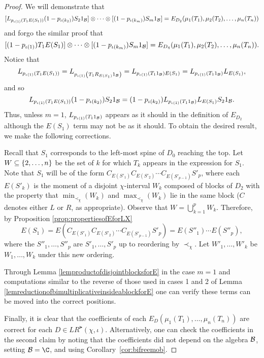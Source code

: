 \begin{proof}
			We will demonstrate that
			\[
				[L_{p_{\iota(1)}\left(T_1E(S_1)\right)}(1-p_{\iota(k_{2})}) S_2 1_{\mathcal{B}}] \otimes \cdots \otimes [(1-p_{\iota(k_{m})}) S_m1_{\mathcal{B}}] = E_{D_2}(\mu_1(T_1), \mu_2(T_2),\ldots, \mu_n(T_n))
			\]
			and forgo the similar proof that
			\[
				[(1-p_{\iota(1)})T_1E(S_1)] \otimes \cdots \otimes [(1-p_{\iota(k_{m})}) S_m1_{\mathcal{B}}] = E_{D_4}(\mu_1(T_1), \mu_2(T_2),\ldots, \mu_n(T_n)).
			\]
			Notice that 
			\[
				L_{p_{\iota(1)}\left(T_1E(S_1)\right)} = L_{p_{\iota(1)}\left(T_1R_{E(S_1)}1_{\mathcal{B}}\right)} = L_{p_{\iota(1)}\left(T_11_{\mathcal{B}}\right) E(S_1)} = L_{p_{\iota(1)}\left(T_11_{\mathcal{B}}\right)}L_{E(S_1)},
			\]
			and so
			\[
				L_{p_{\iota(1)}\left(T_1E(S_1)\right)}(1-p_{\iota(k_{2})}) S_2 1_{\mathcal{B}} = (1-p_{\iota(k_{2})}) L_{p_{\iota(1)}\left(T_11_{\mathcal{B}}\right)}L_{E(S_1)}S_2 1_{\mathcal{B}}.
			\]
			Thus, unless $m = 1$, $L_{p_{\iota(1)}\left(T_11_{\mathcal{B}}\right)}$ appears as it should in the definition of $E_{D_2}$ although the $E(S_1)$ term may not be as it should.
			To obtain the desired result, we make the following corrections.

			Recall that $S_1$ corresponds to the left-most spine of $D_0$ reaching the top.
			Let $W \subseteq \left\{2,\ldots, n\right\}$ be the set of $k$ for which $T_k$ appears in the expression for $S_1$.
			Note that $S_1$ will be of the form $C_{E(S'_1)} C_{E(S'_2)} \cdots C_{E(S'_{p-1})} S'_p$, where each $E(S'_k)$ is the moment of a disjoint $\chi$-interval $W_k$ composed of blocks of $D_2$ with the property that $\min_{\prec_\chi}(W_k)$ and $\max_{\prec_\chi}(W_k)$ lie in the same block ($C$ denotes either $L$ or $R$, as appropriate).
			Observe that $W = \bigcup^p_{k=1} W_k$.
			Therefore, by Proposition \ref{prop:propertiesofEforLX}
			\[
				E(S_1) = E(C_{E(S'_1)} C_{E(S'_2)} \cdots C_{E(S'_{p-1})} S'_p)= E(S''_1) \cdots E(S''_p),
			\]
			where the $S''_1,\ldots, S''_p$ are $S'_1,\ldots, S'_p$ up to reordering by $\prec_\chi$. Let $W'_1,\ldots, W'_k$ be $W_1,\ldots, W_k$ under this new ordering. 

			Through Lemma \ref{lemproductofdisjointblocksforE} in the case $m=1$ and computations similar to the reverse of those used in cases 1 and 2 of Lemma \ref{lemreductionofbimultiplicativeinsideablockforE} one can verify these terms can be moved into the correct positions.



			Finally, it is clear that the coefficients of each $E_D(\mu_1(T_1),\ldots, \mu_n(T_n))$ are correct for each $D \in LR^\lat(\chi, \iota)$.
			Alternatively, one can check the coefficients in the second claim by noting that the coefficients did not depend on the algebra $\mathcal{B}$, setting $\cB=\C$, and using Corollary~\ref{cor:bifreemob}.
		\end{proof}

